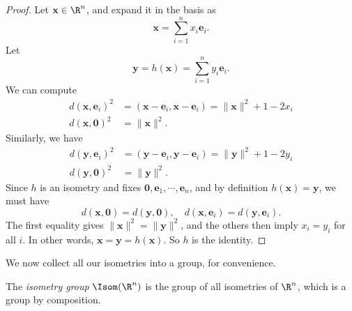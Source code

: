 \documentclass[a4paper]{article}
\begin{document}
\begin{proof}
  Let $\mathbf{x} \in \R^n$, and expand it in the basis as
  \[
    \mathbf{x} = \sum_{i = 1}^n x_i \mathbf{e}_i.
  \]
  Let
  \[
    \mathbf{y} = h(\mathbf{x}) = \sum_{i = 1}^n y_i \mathbf{e}_i.
  \]
  We can compute
  \begin{align*}
    d(\mathbf{x}, \mathbf{e}_i)^2 &= (\mathbf{x} - \mathbf{e}_i, \mathbf{x} - \mathbf{e}_i) = \|\mathbf{x}\|^2 + 1 - 2 x_i\\
    d(\mathbf{x}, \mathbf{0})^2 &= \|\mathbf{x}\|^2.
  \end{align*}
  Similarly, we have
  \begin{align*}
    d(\mathbf{y}, \mathbf{e}_i)^2 &= (\mathbf{y} - \mathbf{e}_i, \mathbf{y} - \mathbf{e}_i) = \|\mathbf{y}\|^2 + 1 - 2 y_i\\
    d(\mathbf{y}, \mathbf{0})^2 &= \|\mathbf{y}\|^2.
  \end{align*}
  Since $h$ is an isometry and fixes $\mathbf{0}, \mathbf{e}_1, \cdots, \mathbf{e}_n$, and by definition $h(\mathbf{x}) = \mathbf{y}$, we must have
  \[
    d(\mathbf{x}, \mathbf{0}) = d(\mathbf{y}, \mathbf{0}), \quad d(\mathbf{x}, \mathbf{e}_i) = d(\mathbf{y}, \mathbf{e}_i).
  \]
  The first equality gives $\|\mathbf{x}\|^2 = \|\mathbf{y}\|^2$, and the others then imply $x_i = y_i$ for all $i$. In other words, $\mathbf{x} = \mathbf{y} = h(\mathbf{x})$. So $h$ is the identity.
\end{proof}

We now collect all our isometries into a group, for convenience.
\begin{defi}
  The \emph{isometry group} $\Isom(\R^n)$ is the group of all isometries of $\R^n$, which is a group by composition.
\end{defi}
\end{document}
